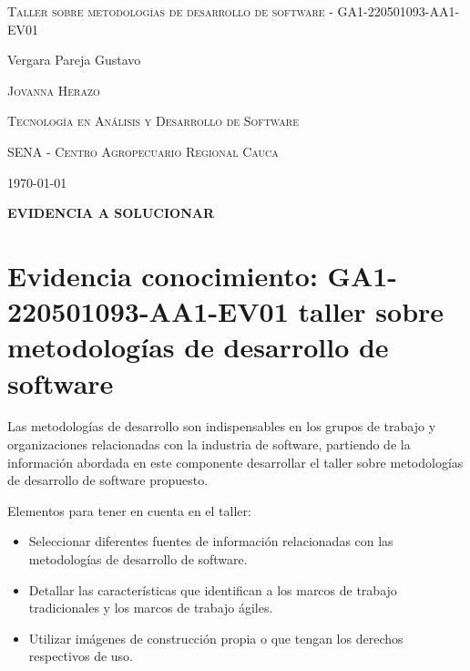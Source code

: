 \documentclass{article}
\author{Gustavo Vergara}
\theoremstyle{mytheoremstyle}
\theoremstyle{mytheoremstyle}
\theoremstyle{myproblemstyle}
\begin{document}
\pgfplotsset{compat=1.18}

\begin{titlepage}
    \centering
    \vspace{2.5cm}
    {\scshape \Large Taller sobre metodologías de desarrollo de software - GA1-220501093-AA1-EV01 \par}
    \vspace{5cm}
    \textbf\large\scshape{\par}
         \vspace{0.5cm}
         
    {\Large Vergara Pareja Gustavo\par}
    \vspace{5cm}
    {\scshape\Large Jovanna Herazo\par}
    \vspace{0.3cm}
    {\scshape\Large Tecnología en Análisis y Desarrollo de Software \par}
    \vspace{0.3cm}
    {\scshape\Large SENA - Centro Agropecuario Regional Cauca\par}
    \vspace{0.3cm}
    {\Large \today \par}
    \end{titlepage}

\begin{flushleft}
    \large \textbf{EVIDENCIA A SOLUCIONAR}\\
    \vspace{0.1cm}
    \section*{Evidencia conocimiento: GA1-220501093-AA1-EV01 taller sobre metodologías de desarrollo de software}
    Las metodologías de desarrollo son indispensables en los grupos de trabajo y organizaciones relacionadas con la industria de software, partiendo de la información abordada en este componente desarrollar el taller sobre metodologías de desarrollo de software propuesto.
    
Elementos para tener en cuenta en el taller:
\begin{itemize}
    \item Seleccionar diferentes fuentes de información relacionadas con las metodologías de desarrollo de software.
    \item Detallar las características que identifican a los marcos de trabajo tradicionales y los marcos de trabajo
    ágiles.
    \item Utilizar imágenes de construcción propia o que tengan los derechos respectivos de uso.
\end{itemize}   
    \end{flushleft}
    \newpage
\end{document}
